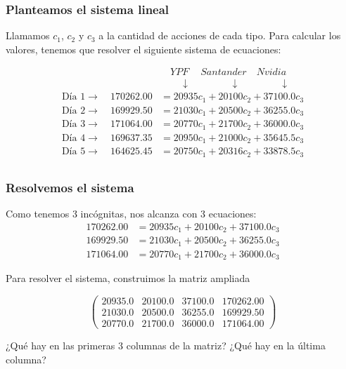 \documentclass[aspectratio=169,12pt]{beamer}
\begin{document}

\begin{frame}
\frametitle{Planteamos el sistema lineal}

Llamamos $c_1$, $c_2$ y $c_3$ a la cantidad de acciones de cada tipo.
Para calcular los valores, tenemos que resolver el siguiente sistema de ecuaciones:

\begin{align*}
& \quad YPF \quad \ Santander \quad Nvidia \\
& \quad \quad \downarrow \quad  \quad  \quad  \quad \downarrow  \quad  \quad \quad \quad \downarrow  \\
\text{D\'ia 1} \rightarrow \quad 170262.00	&= 20935	c_1 + 20100 c_2 + 37100.0 c_3 \\
\text{D\'ia 2} \rightarrow \quad 169929.50	&= 21030	c_1 + 20500 c_2 + 36255.0 c_3 \\
\text{D\'ia 3} \rightarrow \quad 171064.00	&= 20770	c_1 + 21700 c_2 + 36000.0 c_3 \\
\text{D\'ia 4} \rightarrow \quad 169637.35	&= 20950	c_1 + 21000 c_2 + 35645.5 c_3 \\
\text{D\'ia 5} \rightarrow \quad 164625.45	&= 20750	c_1 + 20316 c_2 + 33878.5 c_3 \\
\end{align*}

\end{frame}


\begin{frame}
\frametitle{Resolvemos el sistema}

Como tenemos 3 incógnitas, nos alcanza con 3 ecuaciones:
\begin{align*}
170262.00	&= 20935	c_1 + 20100 c_2 + 37100.0 c_3 \\
169929.50	&= 21030	c_1 + 20500 c_2 + 36255.0 c_3 \\
171064.00	&= 20770	c_1 + 21700 c_2 + 36000.0 c_3
\end{align*}

Para resolver el sistema, construimos la matriz ampliada

$$ 
\left(\begin{array}{ccc|c}
20935.0	& 20100.0 & 37100.0 & 170262.00	 \\
21030.0	& 20500.0 & 36255.0 & 169929.50	 \\
20770.0	& 21700.0 & 36000.0 & 171064.00	
\end{array}\right) 
$$

\vspace{0.5cm}

¿Qué hay en las primeras 3 columnas de la matriz? ¿Qué hay en la última columna?

\end{frame}
\end{document}
